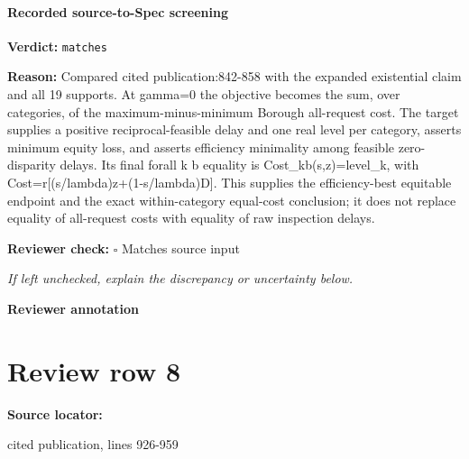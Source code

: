 \documentclass[10pt]{article}
\newcommand{\reviewerbox}{%
  \par\noindent\fbox{\parbox{0.96\linewidth}{\rule{0pt}{0.38in}}}\par
}
\newcommand{\reviewmatch}[1]{%
  \par\noindent\textbf{Reviewer check:} $\square$\; #1\par
  \noindent\emph{If left unchecked, explain the discrepancy or uncertainty below.}\par
}
\begin{document}
\paragraph{Recorded source-to-Spec screening}
\textbf{Verdict:} \texttt{matches}
\\
{\raggedright
\textbf{Reason:} Compared cited publication:\allowbreak{}842-\allowbreak{}858 with the expanded existential claim and all 19 supports.\allowbreak{} At gamma=0 the objective becomes the sum, over categories, of the maximum-\allowbreak{}minus-\allowbreak{}minimum Borough all-\allowbreak{}request cost.\allowbreak{} The target supplies a positive reciprocal-\allowbreak{}feasible delay and one real level per category, asserts minimum equity loss, and asserts efficiency minimality among feasible zero-\allowbreak{}disparity delays.\allowbreak{} Its final forall k b equality is Cost\_\allowbreak{}kb(s,z)=level\_\allowbreak{}k, with Cost=r[(s/\allowbreak{}lambda)z+(1-\allowbreak{}s/\allowbreak{}lambda)D].\allowbreak{} This supplies the efficiency-\allowbreak{}best equitable endpoint and the exact within-\allowbreak{}category equal-\allowbreak{}cost conclusion;\allowbreak{} it does not replace equality of all-\allowbreak{}request costs with equality of raw inspection delays.\allowbreak{}
\par}
\reviewmatch{Matches source input}
\noindent\textbf{Reviewer annotation}\par
\reviewerbox
\clearpage
\hypertarget{source-claim-267c6a6faa58f4f2}{}
\section*{Review row 8}
\textbf{Source locator:} {\footnotesize\raggedright cited publication, lines 926-\allowbreak{}959\par}
\end{document}
